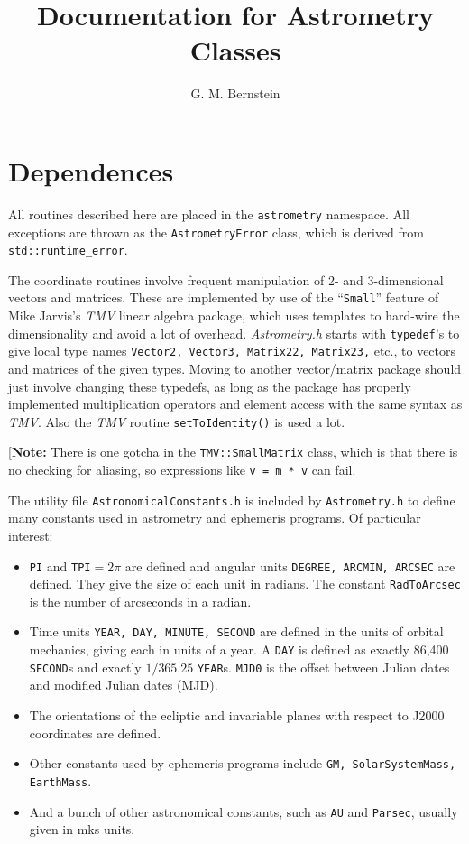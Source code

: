 \documentclass[11pt,preprint,flushrt]{aastex}
\begin{document}
\title{Documentation for Astrometry Classes}

\author{G. M. Bernstein}

\section{Dependences}
All routines described here are placed in the {\tt astrometry} namespace.  All exceptions are thrown as the {\tt AstrometryError} class, which is derived from {\tt std::runtime\_error}.

The coordinate routines involve frequent manipulation of 2- and 3-dimensional vectors and matrices.  These are implemented by use of the ``{\tt Small}'' feature of Mike Jarvis's {\it TMV} linear algebra package, which uses templates to hard-wire the dimensionality and avoid a lot of overhead.  {\it Astrometry.h} starts with {\tt typedef}'s to give local type names {\tt Vector2, Vector3, Matrix22, Matrix23,} etc., to vectors and matrices of the given types.  Moving to another vector/matrix package should just involve changing these typedefs, as long as the package has properly implemented multiplication operators and element access with the same syntax as {\it TMV}.  Also the {\it TMV} routine {\tt setToIdentity()} is used a lot.

[{\bf Note:} There is one gotcha in the {\tt TMV::SmallMatrix} class, which is that there is no checking for aliasing, so expressions like {\tt v = m * v} can fail.

The utility file {\tt AstronomicalConstants.h} is included by {\tt Astrometry.h} to define many constants used in astrometry and ephemeris programs.  Of particular interest:
\begin{itemize}
\item {\tt PI} and {\tt TPI}$=2\pi$ are defined and angular units {\tt DEGREE, ARCMIN, ARCSEC} are defined.  They give the size of each unit in radians.  The constant {\tt RadToArcsec} is the number of arcseconds in a radian.
\item Time units {\tt YEAR, DAY, MINUTE, SECOND} are defined in the units of orbital mechanics, giving each in units of a year.  A {\tt DAY} is defined as exactly 86,400 {\tt SECOND}s and exactly $1/365.25$ {\tt YEAR}s.  {\tt MJD0} is the offset between Julian dates and modified Julian dates (MJD).
\item The orientations of the ecliptic and invariable planes with respect to J2000 coordinates are defined.
\item Other constants used by ephemeris programs include {\tt GM, SolarSystemMass, EarthMass}.
\item And a bunch of other astronomical constants, such as {\tt AU} and {\tt Parsec}, usually given in mks units.
\end{itemize}
\end{document}
